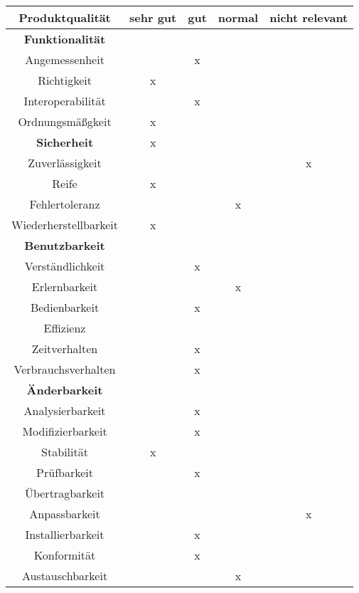 \begin{tabular}{|c|c|c|c|c|}
  \hline                                              %

  \textbf{Produktqualität}  & \textbf{sehr gut}  &    \textbf{gut}  &
  \textbf{normal}           & \textbf{nicht relevant}  \\  %
  \hline                                              %

  \textbf{Funktionalität}  &&&&\\        %
  \hline
Angemessenheit&&x&&\\
\hline
Richtigkeit&x&&&\\
\hline
Interoperabilität&&x&&\\
\hline
Ordnungsmäßgkeit&x&&&\\
\hline
\textbf{Sicherheit}&x&&&\\
\hline
Zuverlässigkeit&&&&x\\
\hline
Reife&x&&&\\
\hline
Fehlertoleranz&&&x&\\
\hline
Wiederherstellbarkeit&x&&&\\
\hline
\textbf{Benutzbarkeit}&&&&\\
\hline
Verständlichkeit&&x&&\\
\hline
Erlernbarkeit&&&x&\\
\hline
Bedienbarkeit&&x&&\\
\hline
Effizienz&&&&\\
\hline
Zeitverhalten&&x&&\\
\hline
Verbrauchsverhalten&&x&&\\
\hline
\textbf{Änderbarkeit}&&&&\\
\hline
Analysierbarkeit&&x&&\\
\hline
Modifizierbarkeit&&x&&\\
\hline
Stabilität&x&&&\\
\hline
Prüfbarkeit&&x&&\\
\hline
Übertragbarkeit&&&&\\
\hline
Anpassbarkeit&&&&x\\
\hline
Installierbarkeit&&x&&\\
\hline
Konformität&&x&&\\
\hline
Austauschbarkeit&&&x&\\
\hline
\end{tabular}


